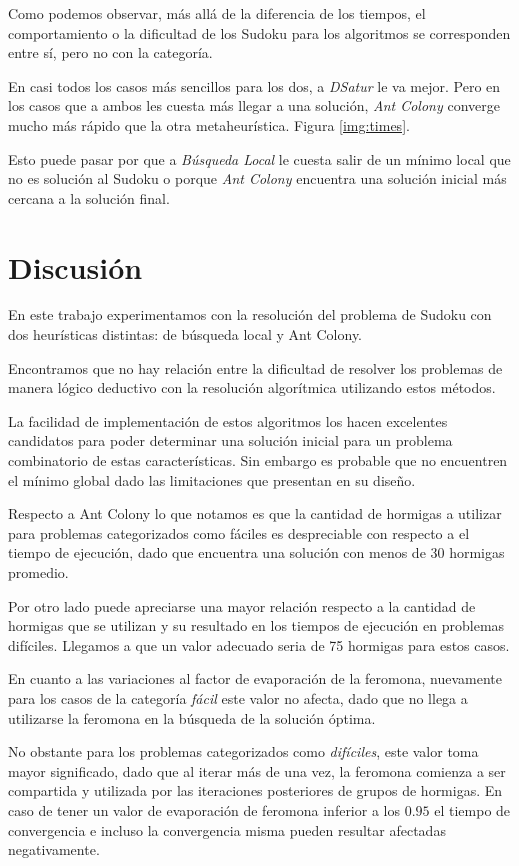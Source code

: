 \documentclass[a4paper,spanish]{article}
\begin{document}
Como podemos observar, más allá de la diferencia de los tiempos, el comportamiento
o la dificultad de los Sudoku para los algoritmos se corresponden entre sí, pero no
con la categoría.

En casi todos los casos más sencillos para los dos, a \emph{DSatur} le va mejor. Pero
en los casos que a ambos les cuesta más llegar a una solución, \emph{Ant Colony} converge
mucho más rápido que la otra metaheurística. Figura \ref{img:times}.

Esto puede pasar por que a \emph{Búsqueda Local} le cuesta salir de un mínimo local que
no es solución al Sudoku o porque \emph{Ant Colony} encuentra una solución inicial
más cercana a la solución final.


\clearpage

\section{Discusión}

En este trabajo experimentamos con la resolución del problema de Sudoku con dos
heurísticas distintas: de búsqueda local y Ant Colony.

Encontramos que no hay relación entre la dificultad de resolver los problemas de
manera lógico deductivo con la resolución algorítmica utilizando estos métodos.

La facilidad de implementación de estos algoritmos los hacen excelentes
candidatos para poder determinar una solución inicial para un problema
combinatorio de estas características. Sin embargo es probable que no encuentren
el mínimo global dado las limitaciones que presentan en su diseño.


Respecto a Ant Colony lo que notamos es que la cantidad de hormigas a utilizar para
problemas categorizados como fáciles es despreciable con respecto a el tiempo de ejecución,
dado que encuentra una solución con menos de 30 hormigas promedio.

Por otro lado puede apreciarse una mayor relación respecto a la cantidad de hormigas que se 
utilizan y su resultado en los tiempos de ejecución en problemas difíciles. Llegamos a que
un valor adecuado seria de 75 hormigas para estos casos.

En cuanto a las variaciones al factor de evaporación de la feromona, nuevamente para los
casos de la categoría \emph{fácil} este valor no afecta, dado que no llega a utilizarse la
feromona en la búsqueda de la solución óptima.

No obstante para los problemas categorizados como \emph{difíciles}, este valor toma mayor
significado, dado que al iterar más de una vez, la feromona comienza a ser compartida y
utilizada por las iteraciones posteriores de grupos de hormigas. En caso de tener un valor
de evaporación de feromona inferior a los $0.95$ el tiempo de convergencia e incluso la
convergencia misma pueden resultar afectadas negativamente.
\end{document}
